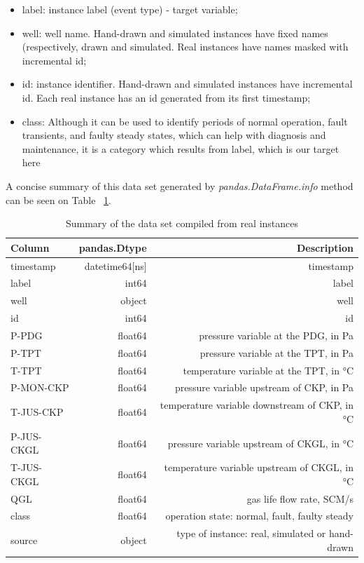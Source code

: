 \documentclass{article}
\begin{document}
\begin{itemize}
\item label: instance label (event type) - target variable;
\item well: well name. Hand-drawn and simulated instances have fixed names (respectively, drawn and simulated. Real instances have names masked with incremental id;
\item id: instance identifier. Hand-drawn and simulated instances have incremental id. Each real instance has an id generated from its first timestamp;
\item class: Although it can be used to identify periods of normal operation, fault transients, and faulty steady states, which can help with diagnosis and maintenance, it is a category which results from label, which is our target here
\end{itemize}

A concise summary of this data set generated by \emph{pandas.DataFrame.info} method can be seen on Table ~\ref{tab:widgets}.

\begin{table}
\centering
\begin{tabular}{l|r|r}

Column & pandas.Dtype & Description\\\hline
timestamp & datetime64[ns] & timestamp \\
label & int64 & label \\        
well & object & well \\       
id & int64 & id \\        
P-PDG & float64 & pressure variable at the PDG, in Pa \\      
P-TPT & float64 & pressure variable at the TPT, in Pa \\     
T-TPT & float64 & temperature variable at the TPT, in °C \\      
P-MON-CKP & float64 & pressure variable upstream of CKP, in Pa \\      
T-JUS-CKP & float64 & temperature variable downstream of CKP, in °C \\      
P-JUS-CKGL & float64 & pressure variable upstream of CKGL, in °C \\       
T-JUS-CKGL & float64 & temperature variable upstream of CKGL,  in °C\\     
QGL & float64 & gas life flow rate, SCM/s\\      
class & float64 & operation state: normal, fault, faulty steady \\   
source & object & type of instance: real, simulated or hand-drawn \\     

\end{tabular}
\caption{\label{tab:widgets}Summary of the data set compiled from real instances}
\end{table}
\end{document}
